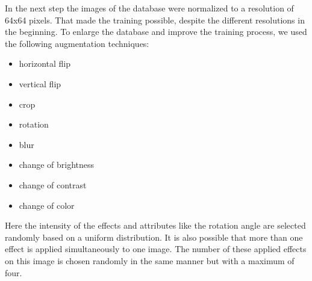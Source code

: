 \documentclass{tubaf-article}
\begin{document}
	In the next step the images of the database were normalized to a resolution of 64x64 pixels. That made the training possible, despite the different resolutions in the beginning. To enlarge the database and improve the training process, we used the following augmentation techniques: \\
	\begin{itemize}
		\item horizontal flip
		\item vertical flip
		\item crop
		\item rotation 
		\item blur
		\item change of brightness
		\item change of contrast
		\item change of color
	\end{itemize}
	Here the intensity of the effects and attributes like the rotation angle are selected randomly based on a uniform distribution. It is also possible that more than one effect is applied simultaneously to one image. The number of these applied effects on this image is chosen randomly in the same manner but with a maximum of four. \\
\end{document}
